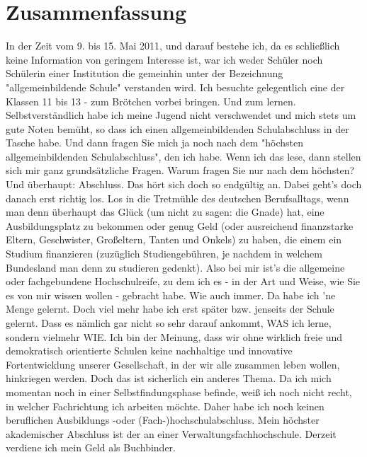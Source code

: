 \section{Zusammenfassung}
In der Zeit vom 9. bis 15. Mai 2011, und darauf bestehe ich, da es schließlich keine Information von geringem Interesse ist, war ich weder Schüler noch Schülerin einer Institution die gemeinhin unter der Bezeichnung "allgemeinbildende Schule" verstanden wird.
Ich besuchte gelegentlich eine der Klassen 11 bis 13 - zum Brötchen vorbei bringen. Und zum lernen.
Selbstverständlich habe ich meine Jugend nicht verschwendet und mich stets um gute Noten bemüht, so dass ich einen allgemeinbildenden Schulabschluss in der Tasche habe.
Und dann fragen Sie mich ja noch nach dem "höchsten allgemeinbildenden Schulabschluss", den ich habe. Wenn ich das lese, dann stellen sich mir ganz grundsätzliche Fragen. Warum fragen Sie nur nach dem höchsten? Und überhaupt: Abschluss. Das hört sich doch so endgültig an. Dabei geht's doch danach erst richtig los. Los in die Tretmühle des deutschen Berufsalltags, wenn man denn überhaupt das Glück (um nicht zu sagen: die Gnade) hat, eine Ausbildungsplatz zu bekommen oder genug Geld (oder ausreichend finanzstarke Eltern, Geschwister, Großeltern, Tanten und Onkels) zu haben, die einem ein Studium finanzieren (zuzüglich Studiengebühren, je nachdem in welchem Bundesland man denn zu studieren gedenkt). Also bei mir ist's die allgemeine oder fachgebundene Hochschulreife, zu dem ich es - in der Art und Weise, wie Sie es von mir wissen wollen - gebracht habe. Wie auch immer. Da habe ich 'ne Menge gelernt. Doch viel mehr habe ich erst später bzw. jenseits der Schule gelernt. Dass es nämlich gar nicht so sehr darauf ankommt, WAS ich lerne, sondern vielmehr WIE. Ich bin der Meinung, dass wir ohne wirklich freie und demokratisch orientierte Schulen keine nachhaltige und innovative Fortentwicklung unserer Gesellschaft, in der wir alle zusammen leben wollen, hinkriegen werden. Doch das ist sicherlich ein anderes Thema.
Da ich mich momentan noch in einer Selbstfindungsphase befinde, weiß ich noch nicht recht, in welcher Fachrichtung ich arbeiten möchte. Daher habe ich noch keinen beruflichen Ausbildungs -oder (Fach-)hochschulabschluss.
Mein höchster akademischer Abschluss ist der an einer Verwaltungsfachhochschule.
Derzeit verdiene ich mein Geld als Buchbinder.
